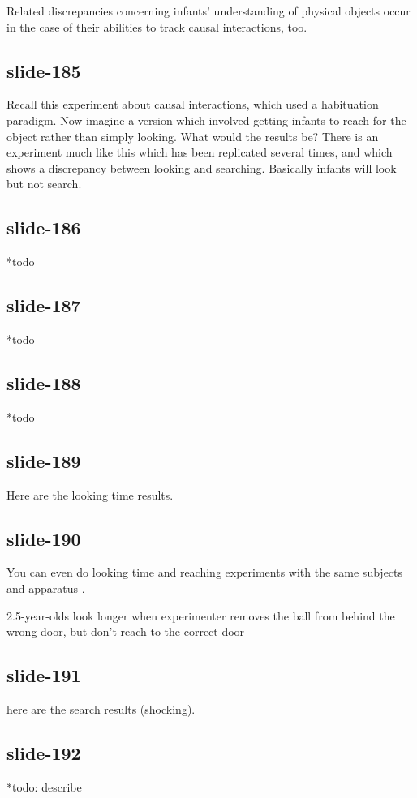 \documentclass[12pt,\papersize]{extarticle}
\begin{document}
Related discrepancies concerning infants' understanding of physical objects occur in the case
of their abilities to track causal interactions, too.
 
\subsection{slide-185}
Recall this experiment about causal interactions, which used a habituation paradigm.
Now imagine a version which involved getting infants to reach for the object rather than simply looking.
What would the results be?
There is an experiment much like this which has been replicated several times, and which shows 
a discrepancy between looking and searching.
Basically infants will look but not search.
 
\subsection{slide-186}
*todo
 
\subsection{slide-187}
*todo
 
\subsection{slide-188}
*todo
 
\subsection{slide-189}
Here are the looking time results.
 
\subsection{slide-190}
You can even do looking time and reaching experiments with the same subjects and apparatus \citep{Hood:2003yg}.
 
2.5-year-olds look longer when experimenter removes the ball from behind the wrong door, but don't reach to the correct door
 
\subsection{slide-191}
here are the search results (shocking).
 
\subsection{slide-192}
*todo: describe
 
\end{document}
